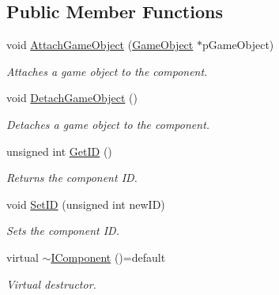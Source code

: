 \subsection*{Public Member Functions}
\begin{DoxyCompactItemize}
\item 
void \mbox{\hyperlink{class_i_component_a4bd5209b8e63446a7fa7d8bf52512590}{Attach\+Game\+Object}} (\mbox{\hyperlink{class_game_object}{Game\+Object}} $\ast$p\+Game\+Object)
\begin{DoxyCompactList}\small\item\em Attaches a game object to the component. \end{DoxyCompactList}\item 
\mbox{\label{class_i_component_af1ab9b7331c157bad637ccc9b1f84738}} 
void \mbox{\hyperlink{class_i_component_af1ab9b7331c157bad637ccc9b1f84738}{Detach\+Game\+Object}} ()
\begin{DoxyCompactList}\small\item\em Detaches a game object to the component. \end{DoxyCompactList}\item 
\mbox{\label{class_i_component_a1ad033cc00f92661575c019a3e5f9e25}} 
unsigned int \mbox{\hyperlink{class_i_component_a1ad033cc00f92661575c019a3e5f9e25}{Get\+ID}} ()
\begin{DoxyCompactList}\small\item\em Returns the component ID. \end{DoxyCompactList}\item 
\mbox{\label{class_i_component_a7ccd24d547d0a4850071db70afdc49e9}} 
void \mbox{\hyperlink{class_i_component_a7ccd24d547d0a4850071db70afdc49e9}{Set\+ID}} (unsigned int new\+ID)
\begin{DoxyCompactList}\small\item\em Sets the component ID. \end{DoxyCompactList}\item 
\mbox{\label{class_i_component_ab1a616cdfb3812f3aabdb97666c71116}} 
virtual \mbox{\hyperlink{class_i_component_ab1a616cdfb3812f3aabdb97666c71116}{$\sim$\+I\+Component}} ()=default
\begin{DoxyCompactList}\small\item\em Virtual destructor. \end{DoxyCompactList}\end{DoxyCompactItemize}
